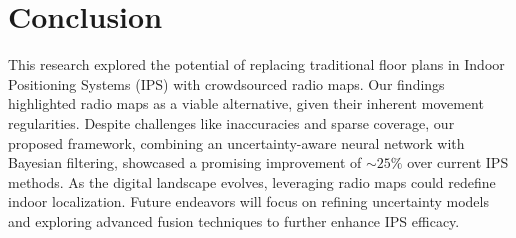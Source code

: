\section{Conclusion}
This research explored the potential of replacing traditional floor plans in Indoor Positioning Systems (IPS) with crowdsourced radio maps. Our findings highlighted radio maps as a viable alternative, given their inherent movement regularities. Despite challenges like inaccuracies and sparse coverage, our proposed framework, combining an uncertainty-aware neural network with Bayesian filtering, showcased a promising improvement of $\sim25\%$ over current IPS methods. As the digital landscape evolves, leveraging radio maps could redefine indoor localization. Future endeavors will focus on refining uncertainty models and exploring advanced fusion techniques to further enhance IPS efficacy.
